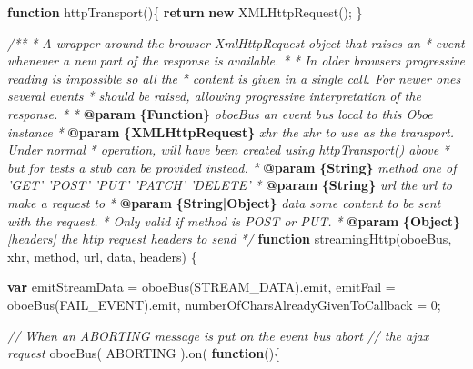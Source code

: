 \documentclass[12pt, ]{article}
\newenvironment{Shaded}{}{}
\newcommand{\KeywordTok}[1]{\textcolor[rgb]{0.00,0.44,0.13}{\textbf{{#1}}}}
\newcommand{\DecValTok}[1]{\textcolor[rgb]{0.25,0.63,0.44}{{#1}}}
\newcommand{\CommentTok}[1]{\textcolor[rgb]{0.38,0.63,0.69}{\textit{{#1}}}}
\newcommand{\FunctionTok}[1]{\textcolor[rgb]{0.02,0.16,0.49}{{#1}}}
\newcommand{\NormalTok}[1]{{#1}}
\begin{document}
\begin{Shaded}
\begin{Highlighting}[]
\KeywordTok{function} \FunctionTok{httpTransport}\NormalTok{()\{}
   \KeywordTok{return} \KeywordTok{new} \FunctionTok{XMLHttpRequest}\NormalTok{();}
\NormalTok{\}}

\CommentTok{/**}
\CommentTok{ * A wrapper around the browser XmlHttpRequest object that raises an }
\CommentTok{ * event whenever a new part of the response is available.}
\CommentTok{ * }
\CommentTok{ * In older browsers progressive reading is impossible so all the }
\CommentTok{ * content is given in a single call. For newer ones several events}
\CommentTok{ * should be raised, allowing progressive interpretation of the response.}
\CommentTok{ *      }
\CommentTok{ * }\KeywordTok{@param}\CommentTok{ }\KeywordTok{\{Function\}}\CommentTok{ oboeBus an event bus local to this Oboe instance}
\CommentTok{ * }\KeywordTok{@param}\CommentTok{ }\KeywordTok{\{XMLHttpRequest\}}\CommentTok{ xhr the xhr to use as the transport. Under normal}
\CommentTok{ *          operation, will have been created using httpTransport() above}
\CommentTok{ *          but for tests a stub can be provided instead.}
\CommentTok{ * }\KeywordTok{@param}\CommentTok{ }\KeywordTok{\{String\}}\CommentTok{ method one of 'GET' 'POST' 'PUT' 'PATCH' 'DELETE'}
\CommentTok{ * }\KeywordTok{@param}\CommentTok{ }\KeywordTok{\{String\}}\CommentTok{ url the url to make a request to}
\CommentTok{ * }\KeywordTok{@param}\CommentTok{ }\KeywordTok{\{String|Object\}}\CommentTok{ data some content to be sent with the request.}
\CommentTok{ *                        Only valid if method is POST or PUT.}
\CommentTok{ * }\KeywordTok{@param}\CommentTok{ }\KeywordTok{\{Object\}}\CommentTok{ [headers] the http request headers to send                       }
\CommentTok{ */}  
\KeywordTok{function} \FunctionTok{streamingHttp}\NormalTok{(oboeBus, xhr, method, url, data, headers) \{}
           
   \KeywordTok{var} \NormalTok{emitStreamData = }\FunctionTok{oboeBus}\NormalTok{(STREAM_DATA).}\FunctionTok{emit}\NormalTok{,}
       \NormalTok{emitFail       = }\FunctionTok{oboeBus}\NormalTok{(FAIL_EVENT).}\FunctionTok{emit}\NormalTok{,}
       \NormalTok{numberOfCharsAlreadyGivenToCallback = }\DecValTok{0}\NormalTok{;      }

   \CommentTok{// When an ABORTING message is put on the event bus abort }
   \CommentTok{// the ajax request         }
   \FunctionTok{oboeBus}\NormalTok{( ABORTING ).}\FunctionTok{on}\NormalTok{( }\KeywordTok{function}\NormalTok{()\{}
  

\end{Highlighting}
\end{Shaded}
\end{document}
